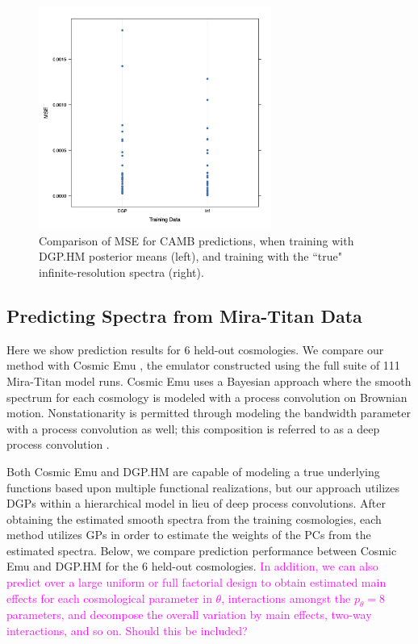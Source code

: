 \documentclass[11pt]{article}
\begin{document}
\begin{figure}
    \centering
    \includegraphics[width=3in]{mse_dot.jpg}
    \caption{Comparison of MSE for CAMB predictions, when training with DGP.HM posterior 
             means (left), and training with the ``true" infinite-resolution spectra (right).}   
    \label{fig:mse_camb}
\end{figure}

\subsection{Predicting Spectra from Mira-Titan Data}
\label{subsec:mira_pred}

Here we show prediction results for 6 held-out cosmologies. We compare our method 
with Cosmic Emu \citep{moran2023mira}, the emulator constructed using the full suite 
of 111 Mira-Titan model runs. Cosmic Emu uses a Bayesian approach where the smooth 
spectrum for each cosmology is modeled with a process convolution on Brownian motion. 
Nonstationarity is permitted through modeling the bandwidth parameter with a process 
convolution as well; this composition is referred to as a deep process convolution 
\citep{moran2024dpc}.

Both Cosmic Emu and DGP.HM are capable of modeling a true underlying functions based 
upon multiple functional realizations, but our approach utilizes DGPs within a 
hierarchical model in lieu of deep process convolutions. After obtaining the estimated 
smooth spectra from the training cosmologies, each method utilizes GPs in order to 
estimate the weights of the PCs from the estimated spectra. Below, we compare prediction 
performance between Cosmic Emu and DGP.HM for the 6 held-out cosmologies. 
\textcolor{magenta}{In addition, we can also predict over a large uniform or full 
factorial design to obtain estimated main effects for each cosmological parameter in 
$\theta$, interactions amongst the $p_\theta=8$ parameters, and decompose the overall 
variation by main effects, two-way interactions, and so on. Should this be included?}
\end{document}
